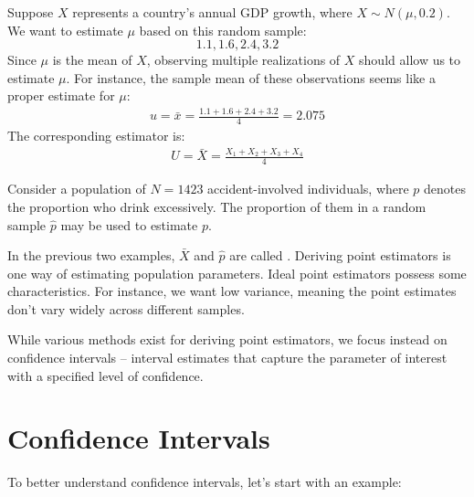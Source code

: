 \begin{exmp}
    Suppose \( X \) represents a country's annual GDP growth, where \( X \sim N(\mu, 0.2) \).
    We want to estimate \( \mu \) based on this random sample:
    \[ 1.1, 1.6, 2.4, 3.2 \]
    Since \( \mu \) is the mean of \( X \), observing multiple realizations of \( X \) should allow us to estimate \( \mu \).
    For instance, the sample mean of these observations seems like a proper estimate for \( \mu \):
    \begin{gather*}
        u = \bar{x} = \frac{1.1 + 1.6 + 2.4 + 3.2}{4} = 2.075
    \end{gather*}
    The corresponding estimator is:
    \begin{gather*}
        U = \bar{X} = \frac{X_1 + X_2 + X_3 + X_4}{4}
    \end{gather*}
\end{exmp}
\begin{exmp}
    Consider a population of \( N = 1423 \) accident-involved individuals, where \( p \) denotes the proportion who drink excessively.
    The proportion of them in a random sample \( \hat{p} \) may be used to estimate \( p \).
\end{exmp}
In the previous two examples, \( \bar{X} \) and \( \hat{p} \) are called .
Deriving point estimators is one way of estimating population parameters.
Ideal point estimators possess some characteristics.
For instance, we want low variance, meaning the point estimates don't vary widely across different samples.

While various methods exist for deriving point estimators, we focus instead on confidence intervals – interval estimates that capture the parameter of interest with a specified level of confidence.

\section{Confidence Intervals}

To better understand confidence intervals, let's start with an example:

